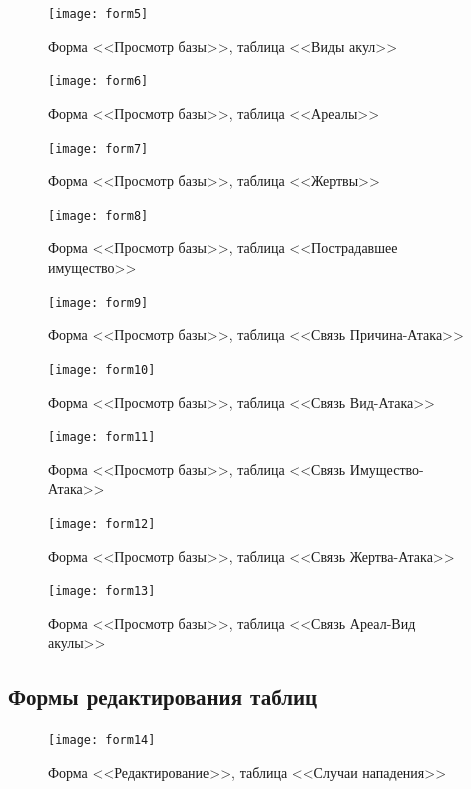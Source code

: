 \documentclass[russian,utf8,simple,emptystyle]{eskdtext}
\begin{document}
\begin{figure}[ht]
\centering
\texttt{[image: form5]}
\caption{Форма <<Просмотр базы>>, таблица <<Виды акул>>}
\end{figure}

\begin{figure}[hb]
\centering
\texttt{[image: form6]}
\caption{Форма <<Просмотр базы>>, таблица <<Ареалы>>}
\end{figure}

\begin{figure}[ht]
\centering
\texttt{[image: form7]}
\caption{Форма <<Просмотр базы>>, таблица <<Жертвы>>}
\end{figure}


\begin{figure}[hb]
\centering
\texttt{[image: form8]}
\caption{Форма <<Просмотр базы>>, таблица <<Пострадавшее имущество>>}
\end{figure}

\begin{figure}[ht]
\centering
\texttt{[image: form9]}
\caption{Форма <<Просмотр базы>>, таблица <<Связь Причина-Атака>>}
\end{figure}

\begin{figure}[hb]
\centering
\texttt{[image: form10]}
\caption{Форма <<Просмотр базы>>, таблица <<Связь Вид-Атака>>}
\end{figure}

\begin{figure}[ht]
\centering
\texttt{[image: form11]}
\caption{Форма <<Просмотр базы>>, таблица <<Связь Имущество-Атака>>}
\end{figure}

\begin{figure}[hb]
\centering
\texttt{[image: form12]}
\caption{Форма <<Просмотр базы>>, таблица <<Связь Жертва-Атака>>}
\end{figure}

\begin{figure}[ht]
\centering
\texttt{[image: form13]}
\caption{Форма <<Просмотр базы>>, таблица <<Связь Ареал-Вид акулы>>}
\end{figure}

\clearpage
\subsection{Формы редактирования таблиц}
\begin{figure}[ht]
\centering
\texttt{[image: form14]}
\caption{Форма <<Редактирование>>, таблица <<Случаи нападения>>}
\end{figure}
\end{document}

